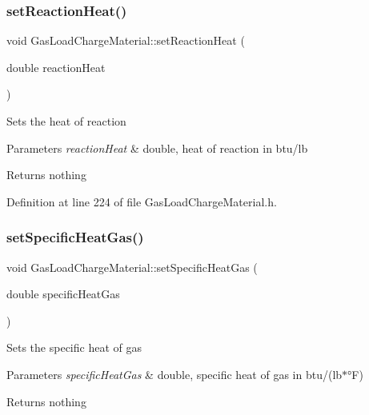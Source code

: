 \subsubsection{\texorpdfstring{set\+Reaction\+Heat()}{setReactionHeat()}\hspace{0.1cm}{\footnotesize\ttfamily [3/3]}}
{\footnotesize\ttfamily void Gas\+Load\+Charge\+Material\+::set\+Reaction\+Heat (\begin{DoxyParamCaption}\item[{double}]{reaction\+Heat }\end{DoxyParamCaption})\hspace{0.3cm}{\ttfamily [inline]}}

Sets the heat of reaction


\begin{DoxyParams}{Parameters}
{\em reaction\+Heat} & double, heat of reaction in btu/lb\\
\hline
\end{DoxyParams}
\begin{DoxyReturn}{Returns}
nothing 
\end{DoxyReturn}


Definition at line 224 of file Gas\+Load\+Charge\+Material.\+h.

\mbox{\label{class_gas_load_charge_material_a07bf6d4ee9161683fbeb3baad16ea7be}} 
\subsubsection{\texorpdfstring{set\+Specific\+Heat\+Gas()}{setSpecificHeatGas()}\hspace{0.1cm}{\footnotesize\ttfamily [1/3]}}
{\footnotesize\ttfamily void Gas\+Load\+Charge\+Material\+::set\+Specific\+Heat\+Gas (\begin{DoxyParamCaption}\item[{double}]{specific\+Heat\+Gas }\end{DoxyParamCaption})\hspace{0.3cm}{\ttfamily [inline]}}

Sets the specific heat of gas


\begin{DoxyParams}{Parameters}
{\em specific\+Heat\+Gas} & double, specific heat of gas in btu/(lb$\ast$°F)\\
\hline
\end{DoxyParams}
\begin{DoxyReturn}{Returns}
nothing 
\end{DoxyReturn}


